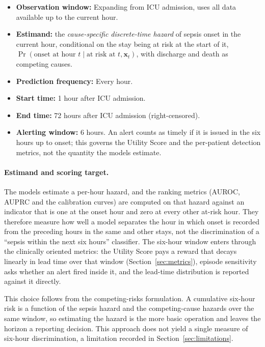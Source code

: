 \begin{itemize}
    \item \textbf{Observation window:} Expanding from ICU admission, uses all
    data available up to the current hour.
    \item \textbf{Estimand:} the \emph{cause-specific discrete-time hazard} of
    sepsis onset in the current hour, conditional on the stay being at risk at
    the start of it, $\Pr(\text{onset at hour } t \mid \text{at risk at } t,
    \mathbf{x}_t)$, with discharge and death as competing causes.
    \item \textbf{Prediction frequency:} Every hour.
    \item \textbf{Start time:} 1 hour after ICU admission.
    \item \textbf{End time:} 72 hours after ICU admission (right-censored).
    \item \textbf{Alerting window:} 6 hours. An alert counts as timely if it is
    issued in the six hours up to onset; this governs the Utility Score and the
    per-patient detection metrics, not the quantity the models estimate.
\end{itemize}

\paragraph{Estimand and scoring target.} The models estimate a per-hour hazard,
and the ranking metrics (AUROC, AUPRC and the calibration curves) are computed
on that hazard against an indicator that is one at the onset hour and zero at
every other at-risk hour. They therefore measure how well a model separates the
hour in which onset is recorded from the preceding hours in the same and other
stays, not the discrimination of a ``sepsis within the next six hours''
classifier. The six-hour window enters through the clinically oriented metrics:
the Utility Score pays a reward that decays linearly in lead time over that
window (Section~\ref{sec:metrics}), episode sensitivity asks whether an
alert fired inside it, and the lead-time distribution is reported against it
directly.

This choice follows from the competing-risks formulation. A cumulative six-hour
risk is a function of the sepsis hazard and the competing-cause hazards over the
same window, so estimating the hazard is the more basic operation and leaves the
horizon a reporting decision. This approach does not yield a single measure of
six-hour discrimination, a limitation recorded in
Section~\ref{sec:limitations}.


